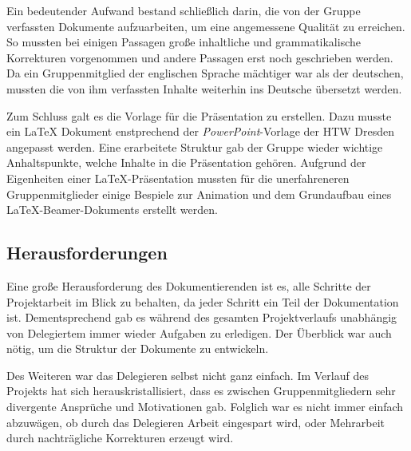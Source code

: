 Ein bedeutender Aufwand bestand schließlich darin, die von der Gruppe verfassten Dokumente aufzuarbeiten, um eine angemessene Qualität zu erreichen. So mussten bei einigen Passagen große inhaltliche und grammatikalische Korrekturen vorgenommen und andere Passagen erst noch geschrieben werden. Da ein Gruppenmitglied der englischen Sprache mächtiger war als der deutschen, mussten die von ihm verfassten Inhalte weiterhin ins Deutsche übersetzt werden.\bigskip

Zum Schluss galt es die Vorlage für die Präsentation zu erstellen. Dazu musste ein LaTeX Dokument enstprechend der \emph{PowerPoint}-Vorlage der HTW Dresden angepasst werden. Eine erarbeitete Struktur gab der Gruppe wieder wichtige Anhaltspunkte, welche Inhalte in die Präsentation gehören. Aufgrund der Eigenheiten einer LaTeX-Präsentation mussten für die unerfahreneren Gruppenmitglieder einige Bespiele zur Animation und dem Grundaufbau eines LaTeX-Beamer-Dokuments erstellt werden.

\subsection{Herausforderungen}
Eine große Herausforderung des Dokumentierenden ist es, alle Schritte der Projektarbeit im Blick zu behalten, da jeder Schritt ein Teil der Dokumentation ist. Dementsprechend gab es während des gesamten Projektverlaufs unabhängig von Delegiertem immer wieder Aufgaben zu erledigen. Der Überblick war auch nötig, um die Struktur der Dokumente zu entwickeln.

Des Weiteren war das Delegieren selbst nicht ganz einfach. Im Verlauf des Projekts hat sich herauskristallisiert, dass es zwischen Gruppenmitgliedern sehr divergente Ansprüche und Motivationen gab. Folglich war es nicht immer einfach abzuwägen, ob durch das Delegieren Arbeit eingespart wird, oder Mehrarbeit durch nachträgliche Korrekturen erzeugt wird.


